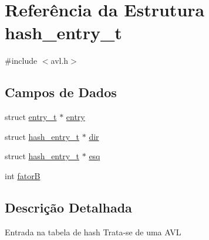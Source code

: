 \hypertarget{structhash__entry__t}{
\section{Referência da Estrutura hash\_\-entry\_\-t}
\label{structhash__entry__t}
}


{\ttfamily \#include $<$avl.h$>$}\subsection*{Campos de Dados}
\begin{DoxyCompactItemize}
\item 
struct \hyperlink{structentry__t}{entry\_\-t} $\ast$ \hyperlink{structhash__entry__t_a37f08e45bf32b96b07d7db8550e4df1b}{entry}
\item 
struct \hyperlink{structhash__entry__t}{hash\_\-entry\_\-t} $\ast$ \hyperlink{structhash__entry__t_aae1502e17b7bf9898325996b0e40259c}{dir}
\item 
struct \hyperlink{structhash__entry__t}{hash\_\-entry\_\-t} $\ast$ \hyperlink{structhash__entry__t_ac3b05345e41365209c1eb12fee3f5d70}{esq}
\item 
int \hyperlink{structhash__entry__t_a4537a128188ab740031d11b94dbed5d0}{fatorB}
\end{DoxyCompactItemize}


\subsection{Descrição Detalhada}
Entrada na tabela de hash Trata-\/se de uma AVL 

